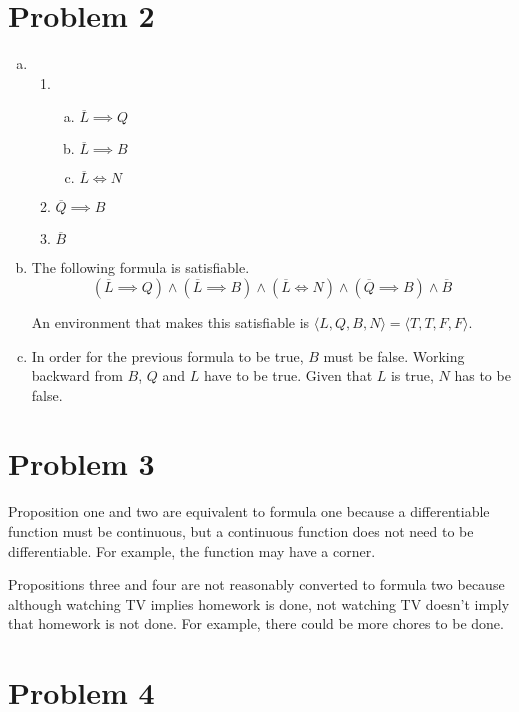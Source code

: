 \documentclass{article}
\begin{document}
\section*{Problem 2}

\begin{enumerate}[a.]
  \item \begin{enumerate}[1.]
      \item \begin{enumerate}[a.]
        \item $\overline{L} \implies Q$
        \item $\overline{L} \implies B$
        \item $\overline{L} \iff N$
        \end{enumerate}
      \item $\overline{Q} \implies B$
      \item $\overline{B}$
    \end{enumerate}
  \item The following formula is satisfiable.
    $$ (\overline{L} \implies Q) \land (\overline{L} \implies B) \land
    (\overline{L} \iff N) \land (\overline{Q} \implies B) \land \overline{B}$$

    An environment that makes this satisfiable is $\langle L, Q, B, N \rangle =
    \langle T, T, F, F \rangle$.

  \item In order for the previous formula to be true, $B$ must be false. Working
    backward from $B$, $Q$ and $L$ have to be true. Given that $L$ is true, $N$
    has to be false.

\end{enumerate}

\section*{Problem 3}

Proposition one and two are equivalent to formula one because a differentiable
function must be continuous, but a continuous function does not need to be
differentiable. For example, the function may have a corner.

Propositions three and four are not reasonably converted to formula two because
although watching TV implies homework is done, not watching TV doesn't imply
that homework is not done. For example, there could be more chores to be done.

\section*{Problem 4}
\end{document}
